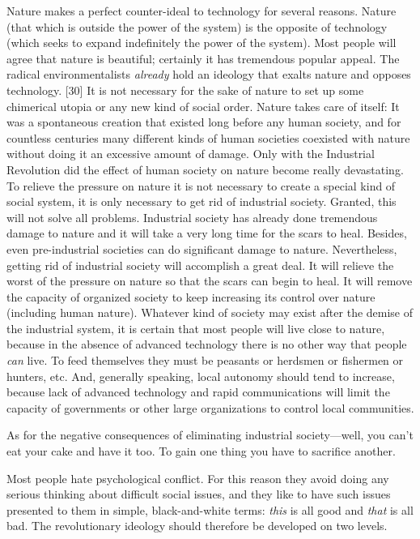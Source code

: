  Nature makes a perfect counter-ideal to technology for several reasons. Nature (that which is outside the power of the system) is the opposite of technology (which seeks to expand indefinitely the power of the system). Most people will agree that nature is beautiful; certainly it has tremendous popular appeal. The radical environmentalists {\em already} hold an ideology that exalts nature and opposes technology. [30] It is not necessary for the sake of nature to set up some chimerical utopia or any new kind of social order. Nature takes care of itself: It was a spontaneous creation that existed long before any human society, and for countless centuries many different kinds of human societies coexisted with nature without doing it an excessive amount of damage. Only with the Industrial Revolution did the effect of human society on nature become really devastating. To relieve the pressure on nature it is not necessary to create a special kind of social system, it is only necessary to get rid of industrial society. Granted, this will not solve all problems. Industrial society has already done tremendous damage to nature and it will take a very long time for the scars to heal. Besides, even pre-industrial societies can do significant damage to nature. Nevertheless, getting rid of industrial society will accomplish a great deal. It will relieve the worst of the pressure on nature so that the scars can begin to heal. It will remove the capacity of organized society to keep increasing its control over nature (including human nature). Whatever kind of society may exist after the demise of the industrial system, it is certain that most people will live close to nature, because in the absence of advanced technology there is no other way that people {\em can} live. To feed themselves they must be peasants or herdsmen or fishermen or hunters, etc. And, generally speaking, local autonomy should tend to increase, because lack of advanced technology and rapid communications will limit the capacity of governments or other large organizations to control local communities.

 As for the negative consequences of eliminating industrial society—well, you can’t eat your cake and have it too. To gain one thing you have to sacrifice another.

 Most people hate psychological conflict. For this reason they avoid doing any serious thinking about difficult social issues, and they like to have such issues presented to them in simple, black-and-white terms: {\em this} is all good and {\em that} is all bad. The revolutionary ideology should therefore be developed on two levels.

